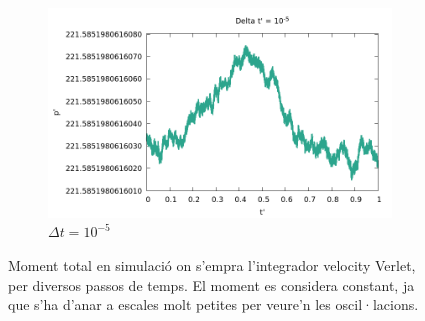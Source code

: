 \documentclass[a4paper,10pt]{article}
\begin{document}
\begin{figure}[h]
\begin{subfigure}{0.3\linewidth}
	\end{subfigure}
	\begin{subfigure}{0.3\linewidth}
		\includegraphics[width=\linewidth]{momentum_verlet_3} 
		\caption{$\Delta t = 10^{-5}$}
		\label{fig:momentumverlet3}
	\end{subfigure}
	\caption{Moment total en simulació on s'empra l'integrador velocity Verlet, per diversos passos de temps. El moment es considera constant, ja que s'ha d'anar a escales molt petites per veure'n les oscil·lacions.}
	\label{fig:momentumverlet}
\end{figure}
\end{document}
